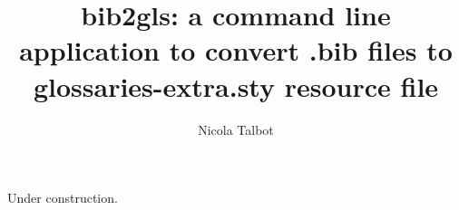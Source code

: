 \documentclass{scrreprt}
\title{bib2gls: a command line application to convert .bib files to
glossaries-extra.sty resource file}
\author{Nicola Talbot}
\begin{document}
\maketitle

Under construction.
\end{document}
